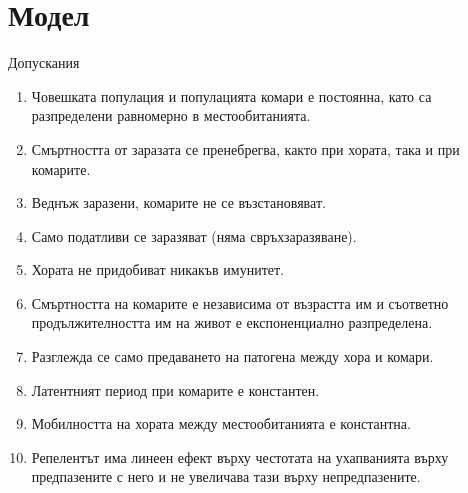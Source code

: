 \section{\hspace{1em}Модел}
\begin{frame}[t]{Допускания}
  \begin{small}
    \begin{enumerate}
      \item Човешката популация и популацията комари е постоянна, като са разпределени равномерно в местообитанията.
      \item Смъртността от заразата се пренебрегва, както при хората, така и при комарите.
      \item Веднъж заразени, комарите не се възстановяват.
      \item Само податливи се заразяват (няма свръхзаразяване).
      \item Хората не придобиват никакъв имунитет.
      \item Смъртността на комарите е независима от възрастта им и съответно продължителността им на живот е експоненциално разпределена.
      \item Разглежда се само предаването на патогена между хора и комари.
      \item Латентният период при комарите е константен.
      \item Мобилността на хората между местообитанията е константна.
      \item Репелентът има линеен ефект върху честотата на ухапванията върху предпазените с него и не увеличава тази върху непредпазените.
    \end{enumerate}
  \end{small}
\end{frame}

